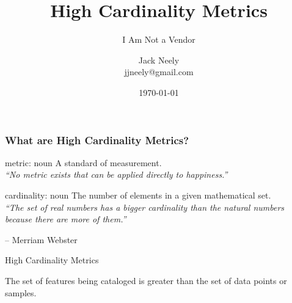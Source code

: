 

\title{High Cardinality Metrics}
\subtitle{I Am Not a Vendor}
\author{Jack Neely\\ jjneely@gmail.com}

\date{\today}

\usepackage[most]{tcolorbox}



\maketitle

\begin{frame}
    \frametitle{What are High Cardinality Metrics?}

    \begin{block}{metric: noun}
        A standard of measurement.\\
        \emph{``No metric exists that can be applied directly to happiness.''}
    \end{block}
    \begin{block}{cardinality: noun}
        The number of elements in a given mathematical set.\\
        \emph{``The set of real numbers has a bigger cardinality than the
        natural numbers because there are more of them.''}
    \end{block}

    \hspace*{\fill} -- Merriam Webster
\end{frame}

\begin{frame}[standout]
    \huge
    High Cardinality Metrics

    \Large
    The set of features being cataloged is greater than the set of data points
    or samples.
\end{frame}

\begin{frame}[plain]
\centering
{}
\end{frame}

